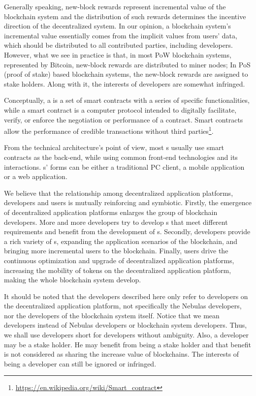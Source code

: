 Generally speaking,  new-block rewards represent incremental value of the
blockchain system and the distribution of such rewards determines the incentive
direction of the decentralized system. In our opinion, a blockchain system's
incremental value essentially comes from the implicit values from users' data,
which should be distributed to all contributed parties, including \dapp
developers. However, what we see in practice is that, in most PoW blockchain
systems, represented by Bitcoin, new-block rewards are distributed to miner
nodes; In PoS (proof of stake) based blockchain systems, the new-block rewards are assigned to  stake holders. Along with it, the interests of \dapp developers are somewhat infringed.


Conceptually, a \dapp is a set of smart contracts with a series of specific
functionalities, while a smart contract is a computer protocol intended to
digitally facilitate, verify, or enforce the negotiation or performance of a
contract. Smart contracts allow the performance of credible transactions
without third
parties\footnote{\url{https://en.wikipedia.org/wiki/Smart\_contract}}.

From the technical architecture's point of view, most {\dapp}s usually use smart
contracts as the back-end, while using common front-end technologies and its
interactions. {\dapp}s' forms can be either a traditional PC client, a mobile
application or a web application.

We believe that the relationship among decentralized application platforms, \dapp developers and \dapp users is mutually reinforcing and symbiotic. Firstly, the emergence of decentralized application platforms enlarges the group of blockchain developers. More and more developers try to develop {\dapp}s that meet different requirements and benefit from the development of {\dapp}s. Secondly, \dapp developers provide a rich variety of {\dapp}s, expanding the application scenarios of the blockchain, and bringing more incremental users to the blockchain. Finally, \dapp users drive the continuous optimization and upgrade of decentralized application platforms, increasing the mobility of tokens on the decentralized application platform, making the whole blockchain system develop.

It should be noted that the developers described here only refer to developers on the decentralized application platform, not specifically the Nebulas developers, nor the developers of the blockchain system itself.
Notice that we mean \dapp developers instead of Nebulas \dapp developers or
blockchain system developers. Thus, we shall use developers short for \dapp
developers without ambiguity. Also, a \dapp developer may be a stake holder.
He may benefit from being a stake holder and that benefit is not considered
as sharing the increase value of blockchains. The interests of being a developer can still be ignored or infringed.


